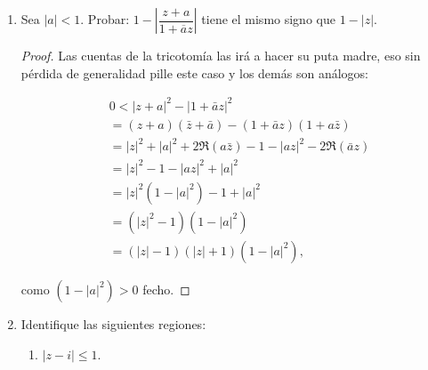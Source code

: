 \documentclass[11pt]{article}
\begin{document}
\begin{enumerate}
\begin{proof}
   Note que el último término de la derecha  de puede escribir como

   $$\Re\left(exp(in\theta/2)\frac{\sin\left((n+1)\theta/2\right)}{\sin(\theta/2)}\right)=\cos(n\theta/2)\frac{\sin((n+1)\theta/2)}{\sin(\theta/2)},$$

   además
   
   $$
\begin{aligned}
\cos \left(\frac{n \theta}{2}\right) \sin \left(\frac{(n+1) \theta}{2}\right)&=\frac{1}{2}\left(\sin \left(\frac{\theta n}{2}+\frac{\theta(n+1)}{2}\right)+\sin \left(\frac{\theta(n+1)}{2}-\frac{n \theta}{2}\right)\right. \\
& =\frac{1}{2}\left(\sin \left(\frac{\theta(2 n+1)}{2}\right)+\sin \left(\frac{\theta}{2}\right)\right) \\
& =\frac{1}{2} \sin \left(\theta\left(1+\frac{1}{2}\right)\right)+\frac{1}{2} \sin \left(\frac{\theta}{2}\right),
\end{aligned}
$$
dividiendo entre $\sin\left(\displaystyle\frac{\theta}{2}\right)$ fecho.

    \end{proof}

    \item Sea $|a| < 1$. Probar: $1 - \left| \dfrac{z + a}{1 + \overline{a}z} \right|$ tiene el mismo signo que $1 - |z|$.

    \begin{proof}
    Las cuentas de la tricotomía las irá a hacer su puta madre, eso sin pérdida de generalidad pille este caso y los demás son análogos:

    $$
\begin{aligned}
& 0<|z+a|^2-|1+\bar{a} z|^2 \\
&=(z+a)(\bar{z}+\bar{a})-(1+\bar{a} z)(1+a \bar{z}) \\
&=|z|^2+|a|^2+2 \Re(a \bar{z})-1-|a z|^2-2 \Re(\bar{a} z) \\
&=|z|^2-1-|a z|^2+|a|^2 \\
&=|z|^2\left(1-|a|^2\right)-1+|a|^2 \\
&=\left(|z|^2-1\right)\left(1-|a|^2\right) \\
&=\left(|z|-1\right)(|z|+1)\left(1-|a|^2\right),
\end{aligned}
$$

como $(1-|a|^2)>0$ fecho.

    \end{proof}

    \item Identifique las siguientes regiones:
    \begin{enumerate}
        \item $|z - i| \leq 1$.


\end{enumerate}
\end{enumerate}
\end{document}
